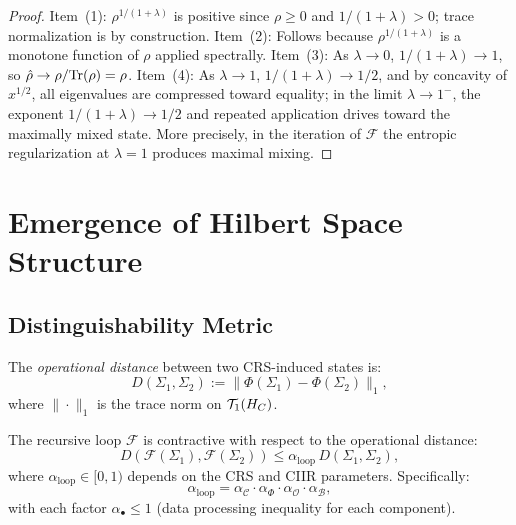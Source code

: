 \begin{proof}
Item~(1): $\rho^{1/(1+\lambda)}$ is positive since $\rho \geq 0$ and
$1/(1+\lambda) > 0$; trace normalization is by construction.
Item~(2): Follows because $\rho^{1/(1+\lambda)}$ is a monotone function
of $\rho$ applied spectrally.
Item~(3): As $\lambda \to 0$, $1/(1+\lambda) \to 1$, so
$\hat{\rho} \to \rho/\mathrm{Tr}(\rho) = \rho$.
Item~(4): As $\lambda \to 1$, $1/(1+\lambda) \to 1/2$, and by
concavity of $x^{1/2}$, all eigenvalues are compressed toward equality;
in the limit $\lambda \to 1^-$, the exponent $1/(1+\lambda) \to 1/2$
and repeated application drives toward the maximally mixed state.
More precisely, in the iteration of $\mathcal{F}$ the entropic
regularization at $\lambda = 1$ produces maximal mixing.
\end{proof}

\section{Emergence of Hilbert Space Structure}
\label{sec:ch13:hilbert}

\subsection{Distinguishability Metric}

\begin{definition}\label{def:13.7}
The \emph{operational distance} between two CRS-induced states is:
\begin{equation}\label{eq:op-dist}
  D(\Sigma_1, \Sigma_2) :=
  \|\Phi(\Sigma_1) - \Phi(\Sigma_2)\|_1,
\end{equation}
where $\|\cdot\|_1$ is the trace norm on $\mathcal{T}_1(H_C)$.
\end{definition}

\begin{theorem}\label{thm:13.2}
The recursive loop $\mathcal{F}$ is contractive with respect to
the operational distance:
\begin{equation}\label{eq:contractivity}
  D(\mathcal{F}(\Sigma_1), \mathcal{F}(\Sigma_2))
  \leq \alpha_{\mathrm{loop}}\, D(\Sigma_1, \Sigma_2),
\end{equation}
where $\alpha_{\mathrm{loop}} \in [0,1)$ depends on the CRS and CIIR
parameters.  Specifically:
\[
  \alpha_{\mathrm{loop}} =
  \alpha_{\mathcal{C}} \cdot \alpha_\Phi \cdot \alpha_{\mathcal{O}}
  \cdot \alpha_{\mathcal{B}},
\]
with each factor $\alpha_\bullet \leq 1$ (data processing inequality
for each component).
\end{theorem}

